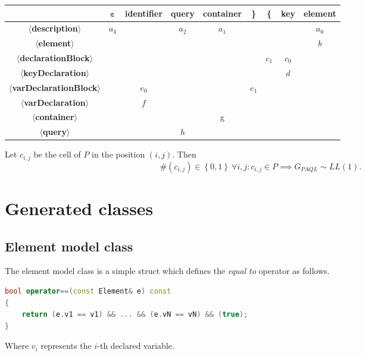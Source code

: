 \documentclass[10pt]{article}  %
\begin{document}
    \begin{center}
    \begin{tabular}{ | c | c | c | c | c | c | c | c | c |}
        \hline
                           & $\mathbf\varepsilon$ & \textbf{identifier} & \textbf{query} & \textbf{container} & \textbf{\}} & \textbf{\{} & \textbf{key} & \textbf{element} \\
        \hline
\textbf{$\langle$description$\rangle$}& $a_3$ & & $a_2$              & $a_1$         &                &             &             & $a_0$\\
       \hline
\textbf{$\langle$element$\rangle$} & &                    &                &                    &             &             &              & $b$\\
        \hline
\textbf{$\langle$declarationBlock$\rangle$} & &                 &                &                    &            &  $c_1$       &  $c_0$    &\\
        \hline
\textbf{$\langle$keyDeclaration$\rangle$} & &               &                &                    &             &         &  $d$       &\\
        \hline
\textbf{$\langle$varDeclarationBlock$\rangle$} &  &  $e_0$               &                &                    &      $e_1$  &      &         &\\
        \hline
\textbf{$\langle$varDeclaration$\rangle$} &  &    $f$             &                &                    &             &        &         &\\
        \hline
\textbf{$\langle$container$\rangle$} & &               &                &              g      &             &         &         &\\
        \hline
\textbf{$\langle$query$\rangle$} & &                &         $h$       &                    &             &         &         &\\
        \hline
    \end{tabular}
    \end{center}
    Let $c_{i,j}$ be the cell of $P$ in the position $(i, j)$. Then
    \[
        \#(c_{i,j}) \in \left\{ 0, 1 \right\}\ \forall i,j : c_{i,j} \in P \implies G_{PAQL}\sim LL(1).
    \]
\section{Generated classes}
    \subsection{Element model class}
        The element model class is a simple struct which defines the \emph{equal to} operator as follows.
        \begin{lstlisting}[language=C++]
bool operator==(const Element& e) const
{
    return (e.v1 == v1) && ... && (e.vN == vN) && (true);
}
        \end{lstlisting}
        Where $v_i$ represents the $i$-th declared variable.
\end{document}
